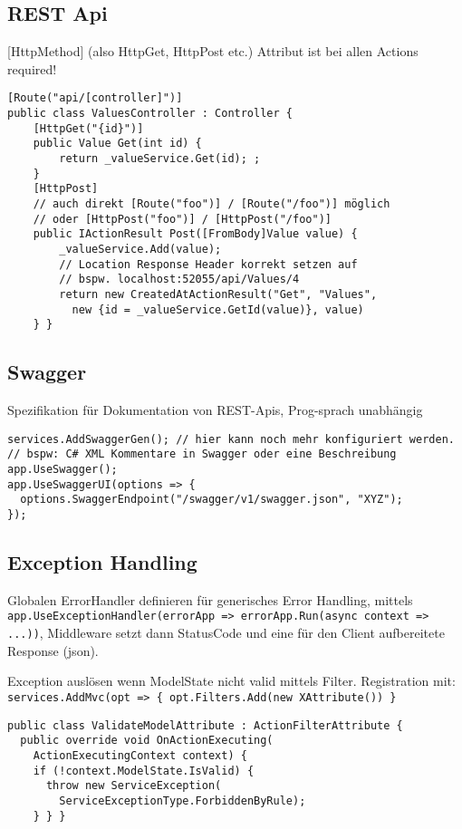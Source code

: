 \begin{multicols*}{2}
\subsection{REST Api}
[HttpMethod] (also HttpGet, HttpPost etc.) Attribut ist bei allen Actions required!
\begin{verbatim}
[Route("api/[controller]")]
public class ValuesController : Controller {
    [HttpGet("{id}")]
    public Value Get(int id) {
        return _valueService.Get(id); ;
    }
    [HttpPost]
    // auch direkt [Route("foo")] / [Route("/foo")] möglich
    // oder [HttpPost("foo")] / [HttpPost("/foo")]
    public IActionResult Post([FromBody]Value value) {
        _valueService.Add(value);
        // Location Response Header korrekt setzen auf
        // bspw. localhost:52055/api/Values/4
        return new CreatedAtActionResult("Get", "Values",
          new {id = _valueService.GetId(value)}, value)
    } }
\end{verbatim}

\subsection{Swagger}
Spezifikation für Dokumentation von REST-Apis, Prog-sprach unabhängig
\begin{verbatim}
services.AddSwaggerGen(); // hier kann noch mehr konfiguriert werden.
// bspw: C# XML Kommentare in Swagger oder eine Beschreibung
app.UseSwagger();
app.UseSwaggerUI(options => {
  options.SwaggerEndpoint("/swagger/v1/swagger.json", "XYZ");
});
\end{verbatim}

\subsection{Exception Handling}
Globalen ErrorHandler definieren für generisches Error Handling, mittels \lstinline|app.UseExceptionHandler(errorApp => errorApp.Run(async context => ...))|, Middleware setzt dann StatusCode und eine für den Client aufbereitete Response (json).

Exception auslösen wenn ModelState nicht valid mittels Filter.
Registration mit: \lstinline|services.AddMvc(opt => { opt.Filters.Add(new XAttribute()) }|
\begin{verbatim}
public class ValidateModelAttribute : ActionFilterAttribute {
  public override void OnActionExecuting(
    ActionExecutingContext context) {
    if (!context.ModelState.IsValid) {
      throw new ServiceException(
        ServiceExceptionType.ForbiddenByRule);
    } } }
\end{verbatim}


\end{multicols*}

